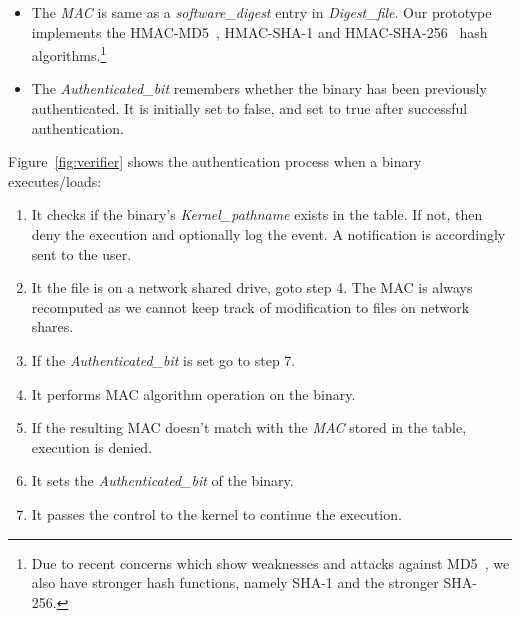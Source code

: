 \begin{itemize}
\item The {\it MAC} is same as a {\it software\_digest} entry in {\it Digest\_file}.
Our prototype implements the
HMAC-MD5~\cite{krawczyk1997rfc2104}, HMAC-SHA-1 
and HMAC-SHA-256~\cite{eastlake2006rfc4634} hash algorithms.\footnote{
Due to recent concerns which show weaknesses and attacks against
MD5~\cite{wang2005break}, 
we also have stronger hash functions, namely SHA-1 and the stronger SHA-256.}
\item The {\it Authenticated\_bit} remembers whether the binary has
been previously authenticated.
It is initially set to false, and set to true after successful authentication.
\end{itemize}

\noindent
Figure~\ref{fig:verifier} shows the authentication process
when a binary executes/loads:
\begin{enumerate}
\item It checks if the binary's {\it Kernel\_pathname} exists in the table.
If not, then deny the execution and optionally log the event.
A notification is accordingly sent to the user. 
\item It the file is on a network shared drive, goto step 4.
The MAC is always
recomputed as we cannot keep track of modification to files on network shares.
\item If the {\it Authenticated\_bit} is set go to step 7.
\item It performs MAC algorithm operation on the binary.
\item If the resulting MAC doesn't match with the 
{\it MAC} stored in the table, execution is denied.
\item It sets the {\it Authenticated\_bit} of the binary.
\item It passes the control to the kernel to continue the execution.
\end{enumerate}

